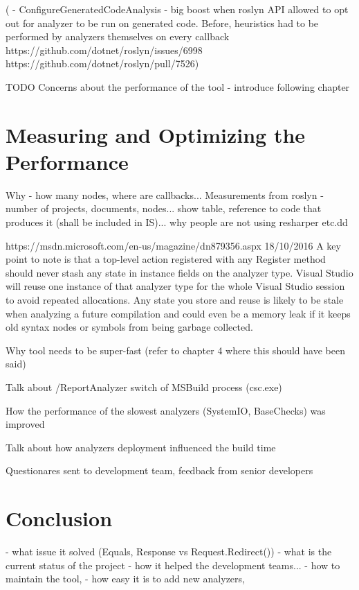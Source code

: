 \documentclass[
  digital, %
  table,   %
  lof,     %
  lot,     %
  oneside,
]{fithesis3}
\begin{document}
(  - ConfigureGeneratedCodeAnalysis - big boost when roslyn API allowed to opt out for analyzer to be run on generated code. Before, heuristics had to be performed by analyzers themselves on every callback
   https://github.com/dotnet/roslyn/issues/6998
   https://github.com/dotnet/roslyn/pull/7526)


TODO
Concerns about the performance of the tool - introduce following chapter

\chapter{Measuring and Optimizing the Performance}
Why - how many nodes, where are callbacks...
Measurements from roslyn - number of projects, documents, nodes... show table, reference to code that produces it (shall be included in IS)... why people are not using resharper etc.dd

https://msdn.microsoft.com/en-us/magazine/dn879356.aspx 18/10/2016
A key point to note is that a top-level action registered with any Register method should never stash any state in instance fields on the analyzer type. Visual Studio will reuse one instance of that analyzer type for the whole Visual Studio session to avoid repeated allocations. Any state you store and reuse is likely to be stale when analyzing a future compilation and could even be a memory leak if it keeps old syntax nodes or symbols from being garbage collected.

Why tool needs to be super-fast (refer to chapter 4 where this should have been said)

Talk about /ReportAnalyzer switch of MSBuild process (csc.exe)

How the performance of the slowest analyzers (SystemIO, BaseChecks) was improved

Talk about how analyzers deployment influenced the build time

Questionares sent to development team, feedback from senior developers

\chapter{Conclusion}
  - what issue it solved (Equals, Response vs Request.Redirect())
  - what is the current status of the project
  - how it helped the development teams...
  - how to maintain the tool, 
  - how easy it is to add new analyzers, 
\end{document}
